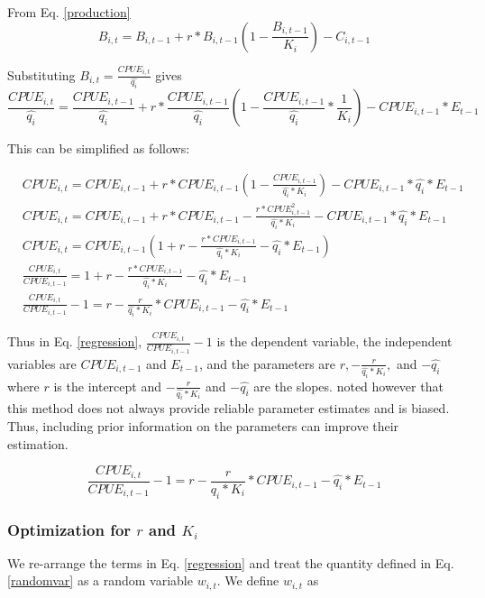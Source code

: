 \documentclass[oneside,12pt,final]{sty/ucthesis-CA2012}
\begin{document}
\begin{mainmatter}
\vspace{5mm}

From Eq. \ref{production}
$$  B_{i,t} = B_{i,t-1} + r*B_{i,t-1} \left(1- \frac{B_{i,t-1}}{K_i} \right)-C_{i,t-1} $$

Substituting $B_{i,t}= \frac{CPUE_{i,t}}{\widehat{q_i}}$ gives  
$$ \frac{CPUE_{i,t}}{\widehat{q_i}} = \frac{CPUE_{i,t-1}}{\widehat{q_i}}  + r*\frac{CPUE_{i,t-1}}{\widehat{q_i}} \left(1-\frac{CPUE_{i,t-1}}{\widehat{q_i}}*\frac{1}{K_i} \right) - CPUE_{i,t-1}*E_{t-1} $$

This can be simplified as follows: 

\begin{align*}
&CPUE_{i,t} = CPUE_{i,t-1} + r*CPUE_{i,t-1} \left(1-\frac{CPUE_{i,t-1}}{\widehat{q_i}*K_i} \right) - CPUE_{i,t-1}*\widehat{q_i}*E_{t-1} \\
&CPUE_{i,t} = CPUE_{i,t-1} + r*CPUE_{i,t-1} -\frac{r*CPUE_{i,t-1}^2}{\widehat{q_i}*K_i}  - CPUE_{i,t-1}*\widehat{q_i}*E_{t-1} \\
&CPUE_{i,t} = CPUE_{i,t-1} \left(1 + r -\frac{r*CPUE_{i,t-1}}{\widehat{q_i}*K_i}  - \widehat{q_i}*E_{t-1} \right) \\
&\frac{CPUE_{i,t}}{CPUE_{i,t-1} } = 1 + r -\frac{r*CPUE_{i,t-1}}{\widehat{q_i}*K_i}  - \widehat{q_i}*E_{t-1} \\
&\frac{CPUE_{i,t}}{CPUE_{i,t-1} } -1 = r -\frac{r}{\widehat{q_i}*K_i}*CPUE_{i,t-1}  - \widehat{q_i}*E_{t-1} 
\end{align*}

Thus in Eq. \ref{regression}, $\frac{CPUE_{i,t}}{CPUE_{i,t-1} } -1$ is the dependent variable, the independent variables are $CPUE_{i,t-1} $ and $E_{t-1} $, and the parameters are $r, -\frac{r}{\widehat{q_i}*K_i},$ and $-\widehat{q_i}$ where $r$ is the intercept and $-\frac{r}{\widehat{q_i}*K_i}$ and $-\widehat{q_i}$ are the slopes. \citet{hilborn1992quantitative} noted however that this method does not always provide reliable parameter estimates and is biased. Thus, including prior information on the parameters can improve their estimation.

\begin{equation} \label{regression}
\frac{CPUE_{i,t}}{CPUE_{i,t-1} } -1 = r -\frac{r}{\widehat{q_i}*K_i}*CPUE_{i,t-1}  - \widehat{q_i}*E_{t-1} 
\end{equation}

\subsubsection{Optimization for $r$ and $K_i$ } 
We re-arrange the terms in Eq. \ref{regression} and treat the quantity defined in Eq. \ref{randomvar} as a random variable $w_{i,t}$.  We define $w_{i,t}$ as


\end{mainmatter}
\end{document}
